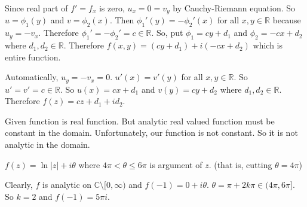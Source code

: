 \begin{problem}
	Since real part of $f' = f_x$ is zero, $u_x = 0 = v_y$ by Cauchy-Riemann equation. So $u = \phi_1 (y)$ and $v = \phi_2 (x)$. Then $\phi _1 ' (y) = - \phi _2 ' (x)$ for all $x, y \in \mathbb{R}$ because $u_y = -v_x$. Therefore $\phi_1 ' = - \phi_2 ' = c \in \mathbb{R}$. So, put $\phi_1 = cy+d_1$ and $\phi_2 = -cx + d_2$ where $d_1, d_2 \in \mathbb{R}$. Therefore $f(x, y) = (cy+d_1) + i(-cx + d_2)$ which is entire function.
\end{problem}

\begin{problem}
	Automatically, $u_y = -v_x = 0$. 
	$u'(x) = v'(y)$ for all $x, y \in \mathbb{R}$. So $u' = v' = c \in \mathbb{R}$.
	So $u(x) = cx + d_1$ and $v(y) = cy + d_2$ where $d_1, d_2 \in \mathbb{R}$.
	Therefore $f(z) = cz + d_1 + i d_2$.

\end{problem}

\begin{problem}
	Given function is real function. But analytic real valued function must be constant in the domain.
	Unfortunately, our function is not constant. So it is not analytic in the domain.
\end{problem}

\begin{problem}
	$f(z) = \ln \lvert z \rvert + i \theta$ where $4\pi < \theta \leq 6\pi$ is argument of $z$. (that is, cutting $\theta = 4\pi$)

	Clearly, $f$ is analytic on $\mathbb{C} \setminus [0, \infty )$ and $f(-1) = 0 + i \theta$.
	$\theta = \pi + 2k \pi \in (4\pi , 6\pi]$. So $k = 2$ and $f(-1) = 5\pi i$.
\end{problem}
